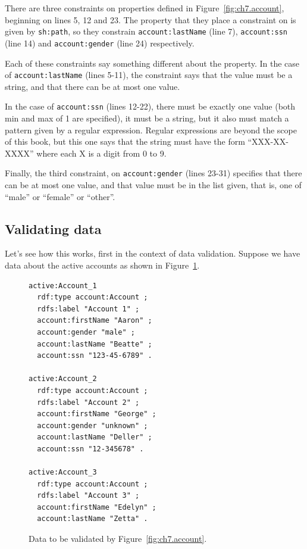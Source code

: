 There are three constraints on properties defined in Figure~\ref{fig:ch7.account}, beginning on lines 5, 12 and 23.  The property that they place a constraint on is given by \texttt{sh:path}, so they constrain \texttt{account:lastName} (line 7), \texttt{account:ssn} (line 14)  and \texttt{account:gender} (line 24) respectively.

Each of these constraints say something different about the property.  
In the case of \texttt{account:lastName} (lines 5-11), the constraint says 
that the value must be a string,  and that there can be at most one value.

In the case of \texttt{account:ssn} (lines 12-22), there must be exactly one value 
(both min and max of 1 are specified), it must be a string, but it also must match
a pattern given by a regular expression.  Regular expressions are beyond the scope
of this book, but this one says that the string must have the form ``XXX-XX-XXXX''
where each X is a digit from 0 to 9.

Finally, the third constraint, on \texttt{account:gender} (lines 23-31) specifies  that
there can be at most one value, and that value must be in the list given, that is, one
of ``male'' or ``female'' or ``other''.  

\hypertarget{validating-data}{%
\subsection{Validating data}\label{validating-data}}


Let's see how this works, first in the context
of data validation.  Suppose we have data about the active accounts as shown in
Figure~\ref{fig:ch7.data}.


\begin{figure}
  \begin{lstlisting}
active:Account_1
  rdf:type account:Account ;
  rdfs:label "Account 1" ;
  account:firstName "Aaron" ;
  account:gender "male" ;
  account:lastName "Beatte" ;
  account:ssn "123-45-6789" .

active:Account_2
  rdf:type account:Account ;
  rdfs:label "Account 2" ;
  account:firstName "George" ;
  account:gender "unknown" ;
  account:lastName "Deller" ;
  account:ssn "12-345678" .

active:Account_3
  rdf:type account:Account ;
  rdfs:label "Account 3" ;
  account:firstName "Edelyn" ;
  account:lastName "Zetta" .
  \end{lstlisting}
\label{fig:ch7.data}
\caption{Data to be validated by Figure~\protect\ref{fig:ch7.account}.}
\end{figure}

